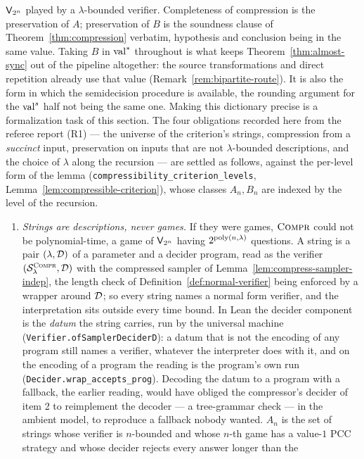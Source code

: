 \begin{remark}
$\mathsf{V}_{2^n}$ played by a $\lambda$-bounded verifier. Completeness of compression is
the preservation of $A$; preservation of $B$ is the soundness clause of
Theorem~\ref{thm:compression} verbatim, hypothesis and conclusion being in the same value.
Taking $B$ in $\mathrm{val}^*$ throughout is what keeps Theorem~\ref{thm:almost-sync} out of the
pipeline altogether: the source transformations and direct repetition already use
that value (Remark~\ref{rem:bipartite-route}). It is also the form in which the semidecision
procedure is available, the rounding argument for the $\mathrm{val}^{s}$ half not being the same
one. Making this dictionary precise is a
formalization task of this section. The four obligations recorded here from the referee
report (R1) --- the universe of the criterion's strings, compression from a
\emph{succinct} input, preservation on inputs that are not $\lambda$-bounded descriptions,
and the choice of $\lambda$ along the recursion --- are settled as follows, against the
per-level form of the lemma (\texttt{compressibility\_criterion\_levels},
Lemma~\ref{lem:compressible-criterion}), whose classes $A_n, B_n$ are indexed by the level
of the recursion.
\begin{enumerate}
\item \emph{Strings are descriptions, never games.} If they were games, $\textsc{Compr}$ could not
  be polynomial-time, a game of $\mathsf{V}_{2^n}$ having $2^{\mathrm{poly}(n, \lambda)}$
  questions. A string is a pair $(\lambda, \mathcal{D})$ of a parameter and a decider
  program, read as the verifier $(\mathcal{S}^{\textsc{Compr}}_\lambda, \mathcal{D})$ with the compressed sampler
  of Lemma~\ref{lem:compress-sampler-indep}, the length check of
  Definition~\ref{def:normal-verifier} being enforced by a wrapper around $\mathcal{D}$; so
  every string names a normal form verifier, and the interpretation sits outside every
  time bound. In Lean the decider component is the \emph{datum} the string carries, run by
  the universal machine (\texttt{Verifier.ofSamplerDeciderD}): a datum that is not the
  encoding of any program still names a verifier, whatever the interpreter does with it, and
  on the encoding of a program the reading is the program's own run
  (\texttt{Decider.wrap\_accepts\_prog}). Decoding the datum to a program with a fallback,
  the earlier reading, would have obliged the compressor's decider of item 2 to reimplement
  the decoder --- a tree-grammar check --- in the ambient model, to reproduce a fallback
  nobody wanted. $A_n$ is the set of strings whose verifier is $n$-bounded and whose $n$-th
  game has a value-$1$ PCC strategy and whose decider rejects every answer longer than the

\end{enumerate}
\end{remark}
